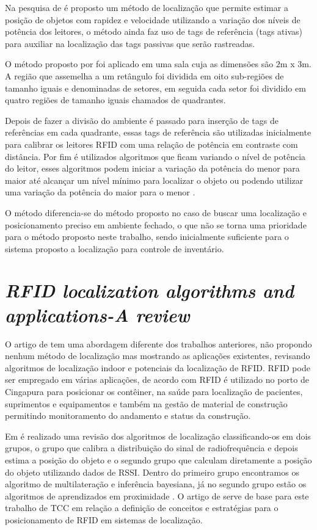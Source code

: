 Na pesquisa de  é proposto um método de localização que permite estimar a posição de objetos 
com rapidez e velocidade utilizando a variação dos níveis de potência dos leitores, o método ainda faz uso de tags de 
referência (tags ativas) para auxiliar na localização das tags passivas que serão rastreadas.


O método proposto por  foi aplicado em uma sala cuja as dimensões são $2$m x $3$m. 
A região que assemelha a um retângulo foi dividida em oito sub-regiões de tamanho iguais e denominadas de setores, 
em seguida cada setor foi dividido em quatro regiões de tamanho iguais chamados de quadrantes.

\par
Depois de fazer a divisão do ambiente é passado para inserção de tags de referências em cada quadrante, 
essas tags de referência são utilizadas inicialmente para calibrar os leitores RFID com uma relação de potência em 
contraste com distância. Por fim é utilizados algoritmos que ficam variando o nível de potência do leitor, esses algoritmos 
podem iniciar a variação da potência do menor para maior até alcançar um nível mínimo para localizar o objeto ou podendo utilizar 
uma variação da potência do maior para o menor \cite{localization2010}.

\par
O método  diferencia-se do método proposto no caso de buscar uma localização e posicionamento 
preciso em ambiente fechado, o que não se torna uma prioridade para o método proposto neste trabalho, sendo inicialmente suficiente 
para o sistema proposto a localização para controle de inventário.


\section{\textit{RFID localization algorithms and applications-A review}}

O artigo de  tem uma abordagem diferente dos trabalhos anteriores, não propondo nenhum método de 
localização mas mostrando as aplicações existentes, revisando algoritmos de localização indoor e potenciais da 
localização de RFID.
%
RFID pode ser empregado em várias aplicações, de acordo com  RFID é utilizado no porto de 
Cingapura para posicionar os contêiner, na saúde para localização de pacientes, suprimentos e equipamentos e também na gestão de 
material de construção permitindo monitoramento do andamento e status da construção.

Em  é realizado uma revisão dos algoritmos de localização classificando-os em dois grupos, 
o grupo que calibra a distribuição do sinal de radiofrequência e depois estima a posição do objeto e o segundo grupo que 
calculam diretamente a posição do objeto utilizando dados de RSSI. Dentro do primeiro grupo encontramos os algoritmo de 
multilateração e inferência bayesiana, já no segundo grupo estão os algoritmos de aprendizados em proximidade \cite{rfid2009review}.
%
O artigo de  serve de base para este trabalho de TCC em relação a definição de conceitos e estratégias para o 
posicionamento de RFID em sistemas de localização.
